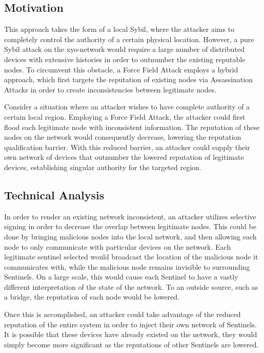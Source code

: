 \documentclass{article}
\begin{document}
\subsection{Motivation}

This approach takes the form of a local Sybil, where the attacker aims to completely control the authority of a certain physical location. However, a pure Sybil attack on the \Gls{xyo-network} would require a large number of distributed devices with extensive histories in order to outnumber the existing reputable nodes. To circumvent this obstacle, a Force Field Attack employs a hybrid approach, which first targets the reputation of existing nodes via Assassination Attacks in order to create inconsistencies between legitimate nodes.

Consider a situation where an attacker wishes to have complete authority of a certain local region. Employing a Force Field Attack, the attacker could first flood each legitimate node with inconsistent information. The reputation of these nodes on the network would consequently decrease, lowering the reputation qualification barrier. With this reduced barrier, an attacker could supply their own network of devices that outnumber the lowered reputation of legitimate devices, establishing singular authority for the targeted region. 

\subsection{Technical Analysis}

In order to render an existing network inconsistent, an attacker utilizes selective signing in order to decrease the overlap between legitimate nodes. This could be done by bringing malicious nodes into the local network, and then allowing each node to only communicate with particular devices on the network. Each legitimate \Gls{sentinel} selected would broadcast the location of the malicious node it communicates with, while the malicious node remains invisible to surrounding Sentinels. On a large scale, this would cause each Sentinel to have a vastly different interpretation of the state of the network. To an outside source, such as a \Gls{bridge}, the reputation of each node would be lowered.

Once this is accomplished, an attacker could take advantage of the reduced reputation of the entire system in order to inject their own network of Sentinels. It is possible that these devices have already existed on the network, they would simply become more significant as the reputations of other Sentinels are lowered.
\end{document}
